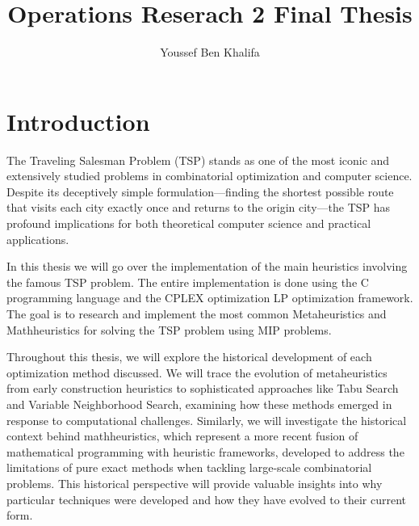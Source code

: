 \documentclass{article}
\title{Operations Reserach 2 Final Thesis}
\author{Youssef Ben Khalifa}
\begin{document}
\maketitle

\tableofcontents

\cleardoublepage

\listofalgorithms
{}

\cleardoublepage

\section{Introduction}
The Traveling Salesman Problem (TSP) stands as one of the most iconic and extensively studied problems in combinatorial optimization and computer science. Despite its deceptively simple formulation—finding the shortest 
possible route that visits each city exactly once and returns to the origin city—the TSP has profound implications for both theoretical computer science and practical applications.

In this thesis we will go over the implementation of the main heuristics involving the famous TSP problem. The entire implementation is done using the C programming language and the 
CPLEX optimization LP optimization framework.
The goal is to research and implement the most common Metaheuristics and Mathheuristics for solving the TSP problem using MIP problems.

Throughout this thesis, we will explore the historical development of each optimization method discussed. We will trace the evolution of metaheuristics from early construction heuristics to 
sophisticated approaches like 
Tabu Search and Variable Neighborhood Search, examining how these methods emerged in response to computational challenges. 
Similarly, we will investigate the historical context behind mathheuristics, which represent a 
more recent fusion of mathematical programming with heuristic frameworks, developed to address the 
limitations of pure exact methods when tackling large-scale combinatorial problems. This historical perspective will 
provide valuable insights into why particular techniques were developed and how they have evolved to their current form.
\end{document}
